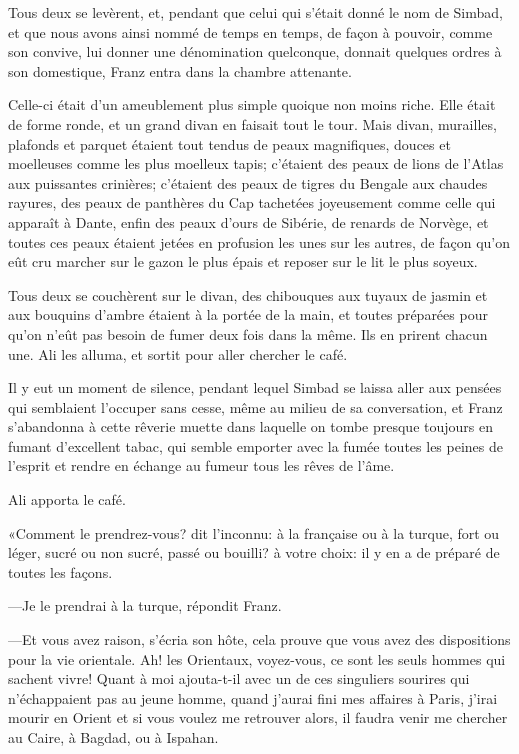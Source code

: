 Tous deux se levèrent, et, pendant que celui qui s'était donné le nom de Simbad, et que nous avons ainsi nommé de temps en temps, de façon à pouvoir, comme son convive, lui donner une dénomination quelconque, donnait quelques ordres à son domestique, Franz entra dans la chambre attenante.

Celle-ci était d'un ameublement plus simple quoique non moins riche. Elle était de forme ronde, et un grand divan en faisait tout le tour. Mais divan, murailles, plafonds et parquet étaient tout tendus de peaux magnifiques, douces et moelleuses comme les plus moelleux tapis; c'étaient des peaux de lions de l'Atlas aux puissantes crinières; c'étaient des peaux de tigres du Bengale aux chaudes rayures, des peaux de panthères du Cap tachetées joyeusement comme celle qui apparaît à Dante, enfin des peaux d'ours de Sibérie, de renards de Norvège, et toutes ces peaux étaient jetées en profusion les unes sur les autres, de façon qu'on eût cru marcher sur le gazon le plus épais et reposer sur le lit le plus soyeux.

Tous deux se couchèrent sur le divan, des chibouques aux tuyaux de jasmin et aux bouquins d'ambre étaient à la portée de la main, et toutes préparées pour qu'on n'eût pas besoin de fumer deux fois dans la même. Ils en prirent chacun une. Ali les alluma, et sortit pour aller chercher le café.

Il y eut un moment de silence, pendant lequel Simbad se laissa aller aux pensées qui semblaient l'occuper sans cesse, même au milieu de sa conversation, et Franz s'abandonna à cette rêverie muette dans laquelle on tombe presque toujours en fumant d'excellent tabac, qui semble emporter avec la fumée toutes les peines de l'esprit et rendre en échange au fumeur tous les rêves de l'âme.

Ali apporta le café.

«Comment le prendrez-vous? dit l'inconnu: à la française ou à la turque, fort ou léger, sucré ou non sucré, passé ou bouilli? à votre choix: il y en a de préparé de toutes les façons.

—Je le prendrai à la turque, répondit Franz.

—Et vous avez raison, s'écria son hôte, cela prouve que vous avez des dispositions pour la vie orientale. Ah! les Orientaux, voyez-vous, ce sont les seuls hommes qui sachent vivre! Quant à moi ajouta-t-il avec un de ces singuliers sourires qui n'échappaient pas au jeune homme, quand j'aurai fini mes affaires à Paris, j'irai mourir en Orient et si vous voulez me retrouver alors, il faudra venir me chercher au Caire, à Bagdad, ou à Ispahan.


